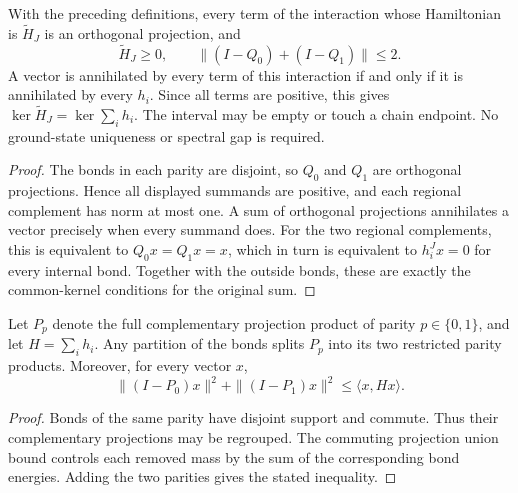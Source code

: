 \begin{lemma}
    \label{thm:physical_ff_regional_kernel}
    \leanok
    With the preceding definitions, every term of the interaction whose
    Hamiltonian is $\widetilde H_J$ is an orthogonal projection, and
    \[
        \widetilde H_J\ge0,\qquad
        \|(I-Q_0)+(I-Q_1)\|\le2.
    \]
    A vector is annihilated by every term of this interaction if and
    only if it is annihilated by every $h_i$. Since all terms are
    positive, this gives $\ker\widetilde H_J=\ker\sum_i h_i$.
    The interval may be empty or touch a chain endpoint.
    No ground-state uniqueness or spectral gap is required.
\end{lemma}
\begin{proof}\leanok
    The bonds in each parity are disjoint, so $Q_0$ and $Q_1$ are
    orthogonal projections. Hence all displayed summands are positive,
    and each regional complement has norm at most one.
    A sum of orthogonal projections annihilates a vector precisely when
    every summand does. For the two regional complements, this is
    equivalent to $Q_0x=Q_1x=x$, which in turn is equivalent to
    $h_i^Jx=0$ for every internal bond. Together with the outside bonds,
    these are exactly the common-kernel conditions for the original sum.
\end{proof}

\begin{lemma}
    \label{lem:physical_parity_partition_mass}
    \leanok
    Let $P_p$ denote the full complementary projection product of parity
    $p\in\{0,1\}$, and let $H=\sum_i h_i$. Any partition of the bonds
    splits $P_p$ into its two restricted parity products. Moreover, for
    every vector $x$,
    \[
        \|(I-P_0)x\|^2+\|(I-P_1)x\|^2\le\langle x,Hx\rangle.
    \]
\end{lemma}
\begin{proof}\leanok
    Bonds of the same parity have disjoint support and commute. Thus
    their complementary projections may be regrouped. The commuting
    projection union bound controls each removed mass by the sum of
    the corresponding bond energies. Adding the two parities gives
    the stated inequality.
\end{proof}

